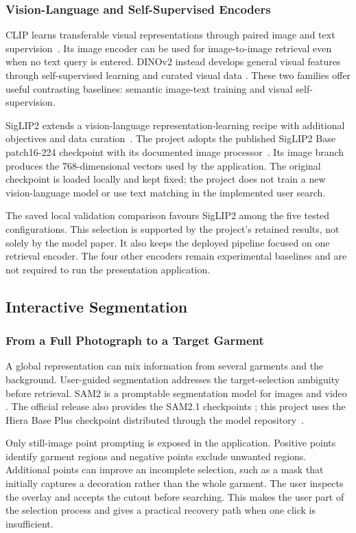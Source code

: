 \subsubsection{Vision-Language and Self-Supervised Encoders}
CLIP learns transferable visual representations through paired image and text
supervision~\cite{Radford2021CLIP}. Its image encoder can be used for image-to-image
retrieval even when no text query is entered. DINOv2 instead develops general
visual features through self-supervised learning and curated visual data
\cite{Oquab2023DINOv2}. These two families offer useful contrasting baselines:
semantic image-text training and visual self-supervision.

SigLIP2 extends a vision-language representation-learning recipe with additional
objectives and data curation~\cite{Tschannen2025SigLIP2}. The project adopts
the published SigLIP2 Base patch16-224 checkpoint with its documented
image processor~\cite{GoogleSigLIP2Card}. Its image branch produces the
768-dimensional vectors used by the application. The original checkpoint is
loaded locally and kept fixed; the project does not train a new vision-language
model or use text matching in the implemented user search.

The saved local validation comparison favours SigLIP2 among the five tested
configurations. This selection is supported by the project's retained results,
not solely by the model paper. It also keeps the deployed pipeline focused on
one retrieval encoder. The four other encoders remain experimental baselines
and are not required to run the presentation application.

\subsection{Interactive Segmentation}
\subsubsection{From a Full Photograph to a Target Garment}
A global representation can mix information from several garments and the
background. User-guided segmentation addresses the target-selection ambiguity
before retrieval. SAM2 is a promptable segmentation model for images and video
\cite{Ravi2024SAM2}. The official release also provides the SAM2.1 checkpoints
\cite{MetaSAM2Repository}; this project uses the Hiera Base Plus checkpoint
distributed through the model repository~\cite{MetaSAM21Card}.

Only still-image point prompting is exposed in the application. Positive points
identify garment regions and negative points exclude unwanted regions. Additional
points can improve an incomplete selection, such as a mask that initially
captures a decoration rather than the whole garment. The user inspects the
overlay and accepts the cutout before searching. This makes the user part of
the selection process and gives a practical recovery path when one click is
insufficient.

